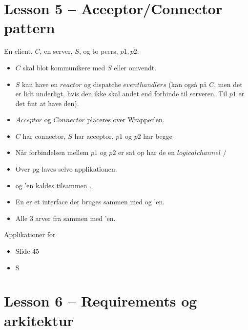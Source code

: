 \documentclass[10pt, a4]{Memoir}
\begin{document}
\newpage
\section*{Lesson 5 -- Aceeptor/Connector pattern}

En client, $C$, en server, $S$, og to peers, $p1, p2$.
\begin{itemize}
	\item $C$ skal blot kommunikere med $S$ eller omvendt.
	\item $S$ kan have en $reactor$ og dispatche $event handlers$ (kan også på $C$, men det er lidt underligt, hvis den ikke skal andet end forbinde til serveren. Til $p1$ er det fint at have den).
	\item $Acceptor$ og $Connector$ placeres over Wrapper'en.
	\item $C$ har connector, $S$ har acceptor, $p1$ og $p2$ har begge
	\item Når forbindelsen mellem $p1$ og $p2$ er sat op har de en $logical channel$ /  
	\item Over  pg  laves selve applikationen.
	\item {} og 'en kaldes tilsammen .
	\item En  er et interface der bruges sammen med  og 'en.
	\item Alle 3 arver fra  sammen med 'en.
\end{itemize}
Applikationer for 
\begin{itemize}
	\item Slide 45
	\item S
\end{itemize}


\newpage
\section*{Lesson 6 -- Requirements og arkitektur}
\end{document}
